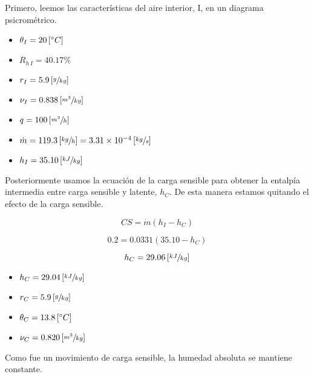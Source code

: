 \documentclass[11pt]{article}
\begin{document}
Primero, leemos las características del aire interior, I, en un diagrama psicrométrico.

\begin{itemize}
    \item
    $ \theta _I = 20 \left[ \degree C \right] $
    
    \item
    $ R_{ h \, I } = 40.17\% $
    
    \item
    $ r_I = 5.9 \left[ \sfrac{ g }{ kg } \right] $
    
    \item
    $ \nu _I = 0.838 \left[ \sfrac{ m^3 }{ kg } \right] $
    
    \item
    $ q = 100 \left[ \sfrac{ m^3 }{ h } \right] $
    
    \item
    $ \dot{ m } = 119.3 \left[ \sfrac{ kg }{ h } \right] = 3.31 \times 10^{ -4 } \left[ \sfrac{ kg }{ s } \right] $
    
    \item
    $ h_I = 35.10 \left[ \sfrac{ kJ }{ kg } \right] $

\end{itemize}

Posteriormente usamos la ecuación de la carga sensible para obtener la entalpía intermedia entre carga sensible y latente, $ h_C $. De esta manera estamos quitando el efecto de la carga sensible.

\[ CS = \dot{ m } \left( h_I - h_C \right) \]

\[ 0.2 = 0.0331 \left( 35.10 - h_C \right) \]

\[ h_C = 29.06 \left[ \sfrac{ kJ }{ kg } \right]\]

\begin{itemize}
    \item
    $ h_C = 29.04 \left[ \sfrac{ kJ }{ kg } \right] $

    \item
    $ r_C = 5.9 \left[ \sfrac{ g }{ kg } \right] $

    \item
    $ \theta _C = 13.8 \left[ \degree C \right] $

    \item
    $ \nu _C = 0.820 \left[ \sfrac{ m^3 }{ kg } \right] $

\end{itemize}

Como fue un movimiento de carga sensible, la humedad absoluta se mantiene constante.
\end{document}
